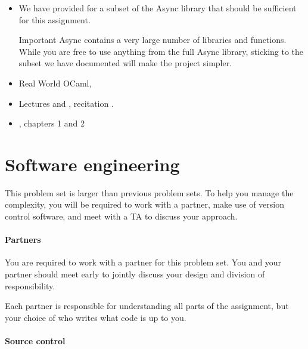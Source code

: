 \documentclass{pset}
\begin{document}
\begin{itemize}
\item We have provided 
      for a subset of the Async library that should be sufficient for this
      assignment.
      \begin{note}{Important}
      Async contains a very large number of libraries and functions.  While you
      are free to use anything from the full Async library, sticking to the
      subset we have documented will make the project simpler.
      \end{note}
\item Real World OCaml, 
\item Lectures  and
               ,
      recitation 
               .
\item {}, chapters 1 and 2
\end{itemize}

\newpage{}

\part{Software engineering}

This problem set is larger than previous problem sets.  To help you manage the
complexity, you will be required to work with a partner, make use of version
control software, and meet with a TA to discuss your approach.

\subsection*{Partners}

You are required to work with a partner for this problem set.  You and your
partner should meet early to jointly discuss your design and division of
responsibility.

Each partner is responsible for understanding all parts of the assignment, but
your choice of who writes what code is up to you.

\subsection*{Source control}
\end{document}
